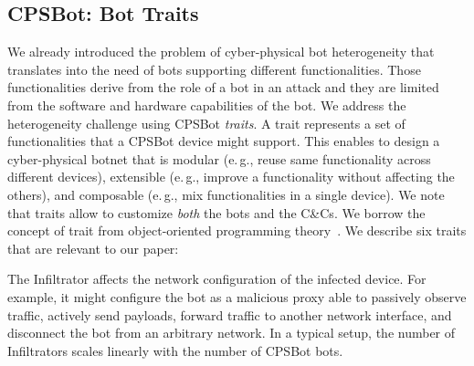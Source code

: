 \documentclass[sigconf]{acmart}
\makeatletter
\newcommand{\Paragraph}[1]{\smallskip\noindent{\bf #1.}}
\newcommand{\eg}{e.\@\,g.,\@\xspace}
\newcommand{\Botnet}{CPSBot\@\xspace}
\newcommand{\CCs}{C\&Cs\@\xspace}
\makeatother
\begin{document}
\subsection{\Botnet: Bot Traits}
\label{sec:architecture}

We already introduced the problem of cyber-physical bot heterogeneity that
translates into the need of bots supporting different functionalities. Those
functionalities derive from the role of a bot in an attack and they are
limited from the software and hardware capabilities of the bot.
We address the heterogeneity challenge using \Botnet
\emph{traits}. A trait represents a set of functionalities that
a \Botnet device might support. This enables to design a cyber-physical botnet
that is modular (\eg reuse same functionality across different devices),
extensible (\eg improve a functionality without affecting the others), and
composable (\eg mix functionalities in a single device). We note that traits
allow to customize \emph{both} the bots and the \CCs. We borrow the concept
of trait from object-oriented programming theory~\cite{scharli2003traits}.
We describe six traits that are relevant to our paper:






\Paragraph{Infiltrator} The Infiltrator affects the network configuration of
the infected device. For example, it might configure the bot as a malicious
proxy able to passively observe traffic, actively send payloads, forward traffic to
another network interface, and disconnect the bot from an arbitrary network.
In a typical setup, the number of Infiltrators scales linearly with the number of
\Botnet bots.
\end{document}
